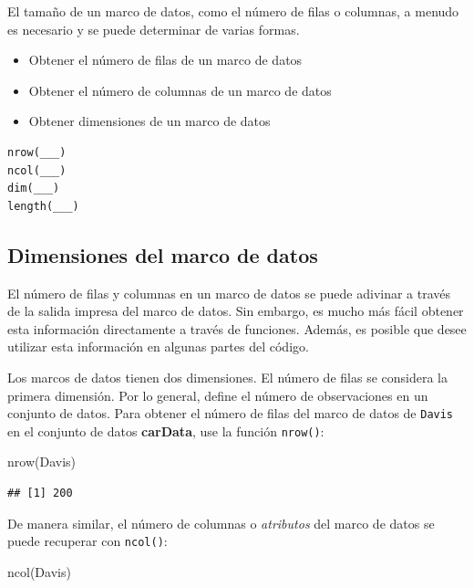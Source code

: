 \documentclass[
]{book}
\newenvironment{Shaded}{\begin{snugshade}}{\end{snugshade}}
\newcommand{\FunctionTok}[1]{\textcolor[rgb]{0.00,0.00,0.00}{#1}}
\newcommand{\NormalTok}[1]{#1}
\providecommand{\tightlist}{%
  \setlength{\itemsep}{0pt}\setlength{\parskip}{0pt}}
\begin{document}
El tamaño de un marco de datos, como el número de filas o columnas, a menudo es necesario y se puede determinar de varias formas.

\begin{itemize}
\tightlist
\item
  Obtener el número de filas de un marco de datos
\item
  Obtener el número de columnas de un marco de datos
\item
  Obtener dimensiones de un marco de datos
\end{itemize}

\begin{verbatim}
nrow(___)
ncol(___)
dim(___)
length(___)
\end{verbatim}

\hypertarget{dimensiones-del-marco-de-datos}{%
\subsection{Dimensiones del marco de datos}\label{dimensiones-del-marco-de-datos}}

El número de filas y columnas en un marco de datos se puede adivinar a través de la salida impresa del marco de datos. Sin embargo, es mucho más fácil obtener esta información directamente a través de funciones. Además, es posible que desee utilizar esta información en algunas partes del código.

Los marcos de datos tienen dos dimensiones. El número de filas se considera la primera dimensión. Por lo general, define el número de observaciones en un conjunto de datos. Para obtener el número de filas del marco de datos de \texttt{Davis} en el conjunto de datos \textbf{carData}, use la función \texttt{nrow()}:

\begin{Shaded}
\begin{Highlighting}[]
\FunctionTok{nrow}\NormalTok{(Davis)}
\end{Highlighting}
\end{Shaded}

\begin{verbatim}
## [1] 200
\end{verbatim}

De manera similar, el número de columnas o \emph{atributos} del marco de datos se puede recuperar con \texttt{ncol()}:

\begin{Shaded}
\begin{Highlighting}[]
\FunctionTok{ncol}\NormalTok{(Davis)}
\end{Highlighting}
\end{Shaded}
\end{document}
